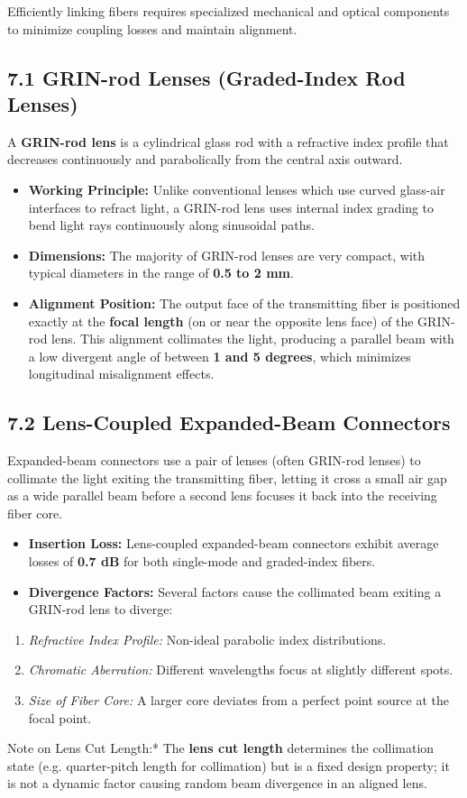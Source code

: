 Efficiently linking fibers requires specialized mechanical and optical components to minimize coupling losses and maintain alignment.

\subsection{7.1 GRIN-rod Lenses (Graded-Index Rod Lenses)}
A \textbf{GRIN-rod lens} is a cylindrical glass rod with a refractive index profile that decreases continuously and parabolically from the central axis outward.
\begin{itemize}
  \item   \textbf{Working Principle:} Unlike conventional lenses which use curved glass-air interfaces to refract light, a GRIN-rod lens uses internal index grading to bend light rays continuously along sinusoidal paths.
  \item   \textbf{Dimensions:} The majority of GRIN-rod lenses are very compact, with typical diameters in the range of \textbf{0.5 to 2 mm}.
  \item   \textbf{Alignment Position:} The output face of the transmitting fiber is positioned exactly at the \textbf{focal length} (on or near the opposite lens face) of the GRIN-rod lens. This alignment collimates the light, producing a parallel beam with a low divergent angle of between \textbf{1 and 5 degrees}, which minimizes longitudinal misalignment effects.
\end{itemize}

\subsection{7.2 Lens-Coupled Expanded-Beam Connectors}
Expanded-beam connectors use a pair of lenses (often GRIN-rod lenses) to collimate the light exiting the transmitting fiber, letting it cross a small air gap as a wide parallel beam before a second lens focuses it back into the receiving fiber core.
\begin{itemize}
  \item   \textbf{Insertion Loss:} Lens-coupled expanded-beam connectors exhibit average losses of \textbf{0.7 dB} for both single-mode and graded-index fibers.
  \item   \textbf{Divergence Factors:} Several factors cause the collimated beam exiting a GRIN-rod lens to diverge:
\end{itemize}
\begin{enumerate}
  \item \textit{Refractive Index Profile:} Non-ideal parabolic index distributions.
  \item \textit{Chromatic Aberration:} Different wavelengths focus at slightly different spots.
  \item \textit{Size of Fiber Core:} A larger core deviates from a perfect point source at the focal point.
\end{enumerate}
    \textit{   }Note on Lens Cut Length:* The \textbf{lens cut length} determines the collimation state (e.g. quarter-pitch length for collimation) but is a fixed design property; it is not a dynamic factor causing random beam divergence in an aligned lens.

